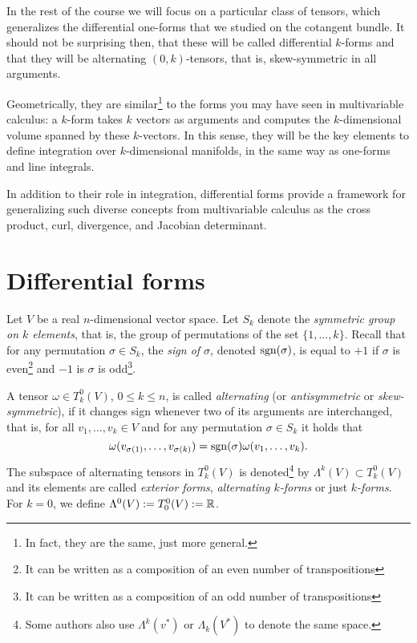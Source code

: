 In the rest of the course we will focus on a particular class of tensors, which generalizes the differential one-forms that we studied on the cotangent bundle.
It should not be surprising then, that these will be called differential $k$-forms and that they will be alternating $(0,k)$-tensors, that is, skew-symmetric in all arguments.

Geometrically, they are similar\footnote{In fact, they are the same, just more general.} to the forms you may have seen in multivariable calculus: a $k$-form takes $k$ vectors as arguments and computes the $k$-dimensional volume spanned by these $k$-vectors.
In this sense, they will be the key elements to define integration over $k$-dimensional manifolds, in the same way as one-forms and line integrals.

In addition to their role in integration, differential forms provide a framework for generalizing such diverse concepts from multivariable calculus as the cross product, curl, divergence, and Jacobian determinant.

\section{Differential forms}

\begin{definition}
	Let $V$ be a real $n$-dimensional vector space.
	Let $S_k$ denote the \emph{symmetric group on $k$ elements}, that is, the group of permutations of the set $\{1,\ldots,k\}$.
	Recall that for any permutation $\sigma\in S_k$, the \emph{sign of $\sigma$}, denoted $\operatorname{sgn}(\sigma)$, is equal to $+1$ if $\sigma$ is even\footnote{It can be written as a composition of an even number of transpositions} and $-1$ is $\sigma$ is odd\footnote{It can be written as a composition of an odd number of transpositions}.

	A tensor $\omega\in T_k^0(V)$, $0\leq k\leq n$, is called \emph{alternating} (or \emph{antisymmetric} or \emph{skew-symmetric}), if it changes sign whenever two of its arguments are interchanged, that is,
	for all $v_1, \ldots, v_k\in V$ and for any permutation $\sigma\in S_k$ it holds that
	\begin{equation}
		\omega(v_{\sigma(1)}, \ldots, v_{\sigma(k)}) = \operatorname{sgn}(\sigma) \omega(v_1, \ldots, v_k).
	\end{equation}
	The subspace of alternating tensors in $T_k^0(V)$ is denoted\footnote{Some authors also use $\Lambda^k(v^*)$ or $\Lambda_k(V^*)$ to denote the same space.} by $\Lambda^k(V) \subset T_k^0(V)$ and its elements are called \emph{exterior forms}, \emph{alternating $k$-forms} or just  \emph{$k$-forms}.
	For $k=0$, we define $\Lambda^0(V) := T_0^0(V) := \mathbb{R}$.
\end{definition}

